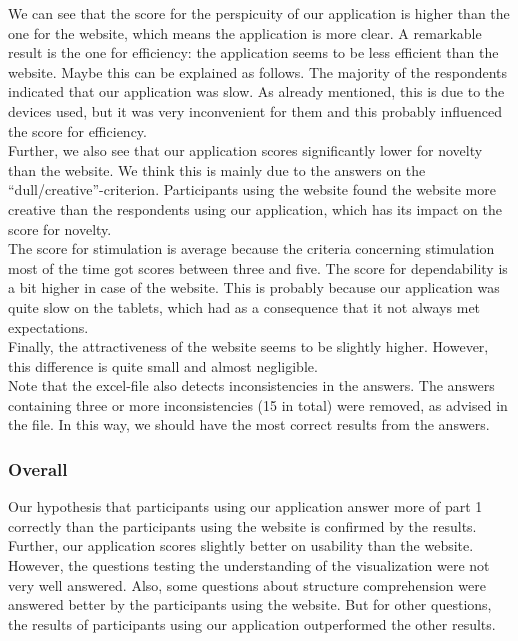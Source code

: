 We can see that the score for the perspicuity of our application is higher than the one for the website, which means the application is more clear. A remarkable result is the one for efficiency: the application seems to be less efficient than the website. Maybe this can be explained as follows. The majority of the respondents indicated that our application was slow. As already mentioned, this is due to the devices used, but it was very inconvenient for them and this probably influenced the score for efficiency.\\

Further, we also see that our application scores significantly lower for novelty than the website. We think this is mainly due to the answers on the ``dull/creative''-criterion. Participants using the website found the website more creative than the respondents using our application, which has its impact on the score for novelty.\\

The score for stimulation is average because the criteria concerning stimulation most of the time got scores between three and five. The score for dependability is a bit higher in case of the website. This is probably because our application was quite slow on the tablets, which had as a consequence that it not always met expectations.\\

Finally, the attractiveness of the website seems to be slightly higher. However, this difference is quite small and almost negligible.\\

Note that the excel-file also detects inconsistencies in the answers. The answers containing three or more inconsistencies (15 in total) were removed, as advised in the file. In this way, we should have the most correct results from the answers.

\subsubsection{Overall}
Our hypothesis that participants using our application answer more of part 1 correctly than the participants using the website is confirmed by the results.\\

Further, our application scores slightly better on usability than the website. However, the questions testing the understanding of the visualization were not very well answered. Also, some questions about structure comprehension were answered better by the participants using the website. But for other questions, the results of participants using our application outperformed the other results.\\

